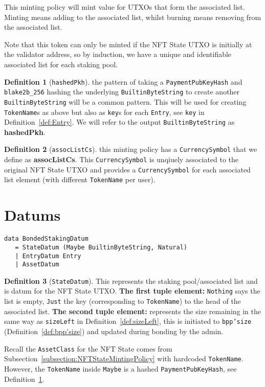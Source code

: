 \documentclass[10pt, a4paper]{article}
\theoremstyle{definition}
\newtheorem{definition}{Definition}[section]
\begin{document}
This minting policy will mint value for UTXOs that form the associated list. Minting means adding to the associated list, whilst burning means removing from the associated list.

Note that this token can only be minted if the NFT State UTXO is initially at the validator address, so by induction, we have a unique and identifiable associated list for each staking pool.

\begin{definition}[\texttt{hashedPkh}]\label{def:hashedPkh} the pattern of taking a \texttt{PaymentPubKeyHash} and \texttt{blake2b\_256} hashing the underlying \texttt{BuiltinByteString} to create another \texttt{BuiltinByteString} will be a common pattern. This will be used for creating \texttt{TokenName}s as above but also as \texttt{key}s for each \texttt{Entry}, see \texttt{key} in Definition~\ref{def:Entry}. We will refer to the output \texttt{BuiltinByteString} as \textbf{hashedPkh}.
\end{definition}

\begin{definition}[\texttt{assocListCs}]\label{def:assocListCs} this minting policy has a \texttt{CurrencySymbol} that we define as \textbf{assocListCs}. This \texttt{CurrencySymbol} is unqiuely associated to the original NFT State UTXO and provides a \texttt{CurrencySymbol} for each associated list element (with different \texttt{TokenName} per user).
\end{definition}

\section{Datums}
\begin{verbatim}
data BondedStakingDatum
   = StateDatum (Maybe BuiltinByteString, Natural)
   | EntryDatum Entry
   | AssetDatum

\end{verbatim}

\begin{definition}[\texttt{StateDatum}]\label{def:StateDatum} This represents the staking pool/associated list and is datum for the NFT State UTXO. \textbf{The first tuple element:} \texttt{Nothing} says the list is empty, \texttt{Just} the key (corresponding to \texttt{TokenName}) to the head of the associated list. \textbf{The second tuple element:} represents the size remaining in the same way as \texttt{sizeLeft} in Definition~\ref{def:sizeLeft}, this is initiated to \texttt{bpp'size} (Definition~\ref{def:bpp'size}) and updated during bonding by the admin.

Recall the \texttt{AssetClass} for the NFT State comes from Subsection~\ref{subsection:NFTStateMintingPolicy} with hardcoded \texttt{TokenName}. However, the \texttt{TokenName} inside \texttt{Maybe} is a hashed \texttt{PaymentPubKeyHash}, see Definition~\ref{def:hashedPkh}.
\end{definition}
\end{document}
